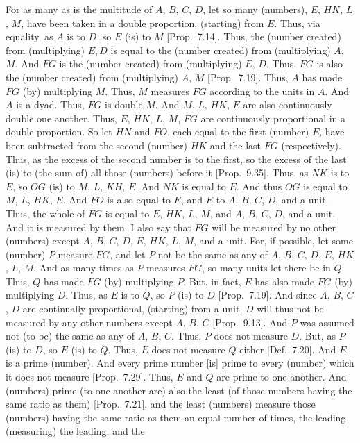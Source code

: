 For as many as is the multitude of $A$, $B$, $C$, $D$, let so many (numbers), $E$, $HK$, $L$, $M$, have been taken in a double
proportion, (starting) from $E$. Thus, via equality, as $A$ is to $D$, so
$E$ (is) to $M$ [Prop.~7.14].
Thus, the (number created) from (multiplying) $E, D$ is equal to the (number
created) from (multiplying) $A$, $M$.
 And $FG$ is the
(number created) from (multiplying) $E$, $D$. Thus, $FG$ is also
the (number created) from (multiplying) $A$, $M$ [Prop.~7.19]. Thus, $A$ has made $FG$ (by) multiplying $M$. Thus, $M$ measures $FG$ according to the units in $A$.
And $A$ is a dyad. Thus, $FG$ is double $M$.  And $M$, $L$, $HK$,
$E$ are also continuously double one another. Thus, $E$, $HK$, $L$, $M$,
$FG$ are continuously proportional in a double proportion. So
let $HN$ and $FO$, each equal to the first (number) $E$, have been subtracted from the second (number) $HK$ and the last $FG$ (respectively). 
Thus, as the excess of the second number is to the first, so the excess
of the last (is) to (the sum of) all  those (numbers) before it [Prop.~9.35]. Thus, as $NK$ is to $E$, so
$OG$ (is) to $M$, $L$, $KH$, $E$. And $NK$ is equal to $E$. And thus
$OG$ is equal to $M$, $L$, $HK$, $E$. And $FO$ is also equal to $E$,
and $E$ to $A$, $B$, $C$, $D$, and a unit. Thus, the whole of $FG$ is equal to
$E$, $HK$, $L$, $M$, and $A$, $B$, $C$, $D$, and a unit. And it is
measured by them. I also say that $FG$ will be measured by no other (numbers)
except $A$, $B$, $C$, $D$, $E$, $HK$, $L$, $M$, and a unit. For, if possible, let some (number) $P$ measure $FG$, and let $P$ not be the same
as any of $A$, $B$, $C$, $D$, $E$, $HK$, $L$, $M$. And as many times
as $P$ measures $FG$, so many units let there be in $Q$. Thus, $Q$ has
made $FG$ (by) multiplying $P$. But, in fact, $E$ has  also made $FG$
(by) multiplying $D$. Thus, as $E$ is to $Q$, so $P$ (is) to $D$
[Prop.~7.19]. And since $A$, $B$, $C$, $D$
are continually proportional, (starting) from a unit, $D$ will thus not be measured
by any other numbers except $A$, $B$, $C$ [Prop.~9.13]. And $P$ was assumed not (to be) the same as any of $A$, $B$, $C$. Thus, $P$ does not measure $D$. But, as $P$ (is) to
$D$, so $E$ (is) to $Q$. Thus, $E$ does not measure $Q$ either
 [Def.~7.20]. And $E$ is a prime (number).
And every prime number [is] prime to every  (number) which it does not
measure [Prop.~7.29]. Thus, $E$ and $Q$ are
prime to one another. And  (numbers) prime (to one another are) also the least (of those
numbers having the same ratio as them) [Prop.~7.21],
and the least (numbers) measure those (numbers) having the same ratio as them an equal number of times, the leading (measuring) the leading, and the
